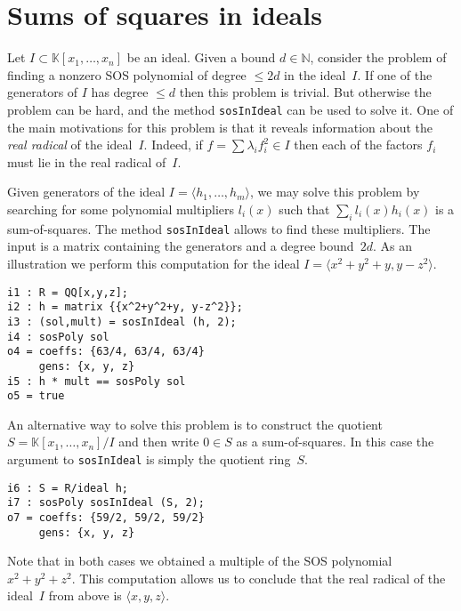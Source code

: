 \documentclass[11pt]{amsart}
\theoremstyle{plain}%
\theoremstyle{definition}
\theoremstyle{remark}
\newcommand{\SOS}{\textsc{SOS}\xspace}
\newcommand{\NN}{\mathbb{N}}
\newcommand{\kk}{\mathbb{K}}
\begin{document}

\section{Sums of squares in ideals}
Let $I \subset \kk[x_{1},\dots,x_{n}]$ be an ideal.  
Given a bound $d\in\NN$, consider the problem of finding a nonzero SOS polynomial of degree $\leq 2d$ in the ideal~$I$.
If one of the generators of $I$ has degree $\leq d$ then this problem is trivial.
But otherwise the problem can be hard, and the method \verb|sosInIdeal| can be used to solve it.
One of the main motivations for this problem is that it reveals information about the \emph{real radical} of the ideal~$I$.
Indeed, if $f = \sum \lambda_i f_i^2 \in I$ then each of the factors $f_i$ must lie in the real radical of~$I$.

Given generators of the ideal $I=\langle h_1,\dots,h_m\rangle$, we may solve this problem by searching for some polynomial multipliers $l_i(x)$ such that  $\sum_i l_i(x) h_i(x)$ is a sum-of-squares.
The method \verb|sosInIdeal| allows to find these multipliers.
The input is a matrix containing the generators and a degree bound~$2d$.
As an illustration we perform this computation for the ideal $I=\langle x^2+y^2+y, y-z^2 \rangle$.
{\small
\begin{verbatim}
i1 : R = QQ[x,y,z];
i2 : h = matrix {{x^2+y^2+y, y-z^2}};
i3 : (sol,mult) = sosInIdeal (h, 2);
i4 : sosPoly sol
o4 = coeffs: {63/4, 63/4, 63/4}
     gens: {x, y, z}
i5 : h * mult == sosPoly sol
o5 = true
\end{verbatim}
}
\noindent
An alternative way to solve this problem is to construct the quotient $S = \kk[x_{1},\dots,x_{n}]/I$ and then write $0\in S$ as a sum-of-squares.
In this case the argument to \verb|sosInIdeal| is simply the quotient ring~$S$.
{\small
\begin{verbatim}
i6 : S = R/ideal h;
i7 : sosPoly sosInIdeal (S, 2);
o7 = coeffs: {59/2, 59/2, 59/2}
     gens: {x, y, z}
\end{verbatim}
}
\noindent
Note that in both cases we obtained a multiple of the SOS polynomial $x^2+y^2+z^2$.
This computation allows us to conclude that the real radical of the ideal~$I$ from above is $\langle x,y,z\rangle$.
\end{document}
